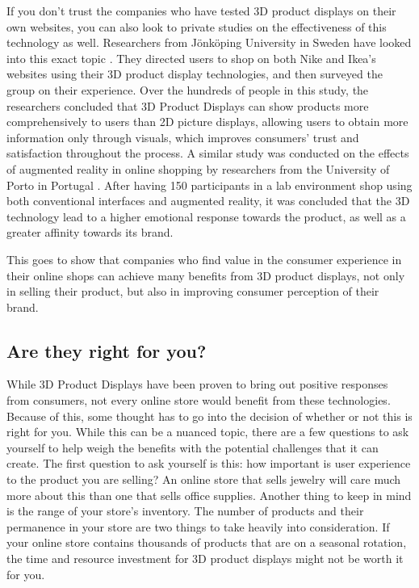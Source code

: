 \documentclass[10pt,final,journal,compsoc]{IEEEtran}
\begin{document}
    If you don't trust the companies who have tested 3D product displays on their own websites, you can also look to private studies on the effectiveness of this technology as well. Researchers from Jönköping University in Sweden have looked into this exact topic \cite{article1}. They directed users to shop on both Nike and Ikea's websites using their 3D product display technologies, and then surveyed the group on their experience. Over the hundreds of people in this study, the researchers concluded that 3D Product Displays can show products more comprehensively to users than 2D picture displays, allowing users to obtain more information only through visuals, which improves consumers' trust and satisfaction throughout the process. A similar study was conducted on the effects of augmented reality in online shopping by researchers from the University of Porto in Portugal \cite{article2}. After having 150 participants in a lab environment shop using both conventional interfaces and augmented reality, it was concluded that the 3D technology lead to a higher emotional response towards the product, as well as a greater affinity towards its brand.
    
    This goes to show that companies who find value in the consumer experience in their online shops can achieve many benefits from 3D product displays, not only in selling their product, but also in improving consumer perception of their brand.

    \subsection{Are they right for you?}
    While 3D Product Displays have been proven to bring out positive responses from consumers, not every online store would benefit from these technologies. Because of this, some thought has to go into the decision of whether or not this is right for you. While this can be a nuanced topic, there are a few questions to ask yourself to help weigh the benefits with the potential challenges that it can create. The first question to ask yourself is this: how important is user experience to the product you are selling? An online store that sells jewelry will care much more about this than one that sells office supplies. Another thing to keep in mind is the range of your store’s inventory. The number of products and their permanence in your store are two things to take heavily into consideration. If your online store contains thousands of products that are on a seasonal rotation, the time and resource investment for 3D product displays might not be worth it for you.
    
\end{document}

